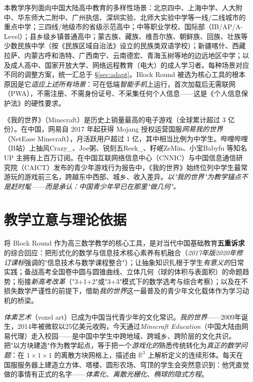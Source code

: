 \documentclass[12pt,a4paper]{scrartcl}
\newcommand{\acc}[1]{\textcolor{accent}{\textbf{#1}}}
\begin{document}
\begin{zhushi}[中国大陆高中的多样性]
本教学序列面向中国大陆高中教育的多样性场景：北京四中、上海中学、人大附中、华东师大二附中、广州执信、深圳实验、北师大实验中学等一线/二线城市的重点中学；三四线/地级市的省级示范高中；中等职业学校、国际部（IB/AP/A-Level）；县乡级乡镇普通高中；蒙古族、藏族、维吾尔族、朝鲜族、回族、壮族等少数民族中学（按《民族区域自治法》设立的民族类双语学校）；新疆喀什、西藏拉萨、内蒙古呼和浩特、广西南宁、云南德宏、青海玉树等地的边远地区中学；以及成人高中、国家开放大学、网络远程教育（电大）的成人学习者。每种场景对应不同的调整方案，统一汇总于 §\ref{sec:adapt}。Block Round 被选为核心工具的根本原因是它\emph{适应上述所有场景}：可在低端\emph{智能手机}上运行，首次加载后无需联网（PWA），不需注册、不需身份证号、不采集任何个人信息——这是《个人信息保护法》的硬性要求。
\end{zhushi}

\begin{minecraft}
《我的世界》（Minecraft）是历史上销量最高的电子游戏（全球累计超过 3 亿份）。在中国，网易自 2017 年起获得 Mojang 授权运营国服\emph{网易我的世界}（NetEase Minecraft），月活跃用户超过 1 亿，其中相当比例为中学生。哔哩哔哩（B站）上抽风Crazy\_、Joe粥、锐刻五Reek\_、籽岷ZeMin、小宝Babyfu 等知名 UP 主拥有上百万订阅。在中国互联网络信息中心（CNNIC）与中国信息通信研究院（CAICT）发布的青少年游戏行为报告中，《我的世界》始终位列中学生最常游玩的游戏前三名，跨越东中西部、城乡、收入差异。\emph{以"我的世界"为教学锚点不是赶时髦——而是承认：中国青少年早已在那里"做几何"。}
\end{minecraft}

\section{教学立意与理论依据}\label{sec:justificativa}

将 Block Round 作为高三数学教学的核心工具，是对当代中国基础教育\acc{五重诉求}的综合回应：把形式化的数学与信息技术核心素养有机融合（\emph{2017年版2020年修订课标}强调的"信息技术与数学课程整合"）；让抽象知识扎根于学生\emph{有意义的}日常实践；备战高考全国卷中圆与圆锥曲线、立体几何（球的体积与表面积）的命题趋势；衔接\emph{新高考改革}（"3+1+2"或"3+3"模式下的数学选考与综合考察）；以及在不损失数学严谨性的前提下，借助\emph{我的世界}这一最普及的青少年文化载体作为学习动机的桥梁。

\emph{体素艺术}（voxel art）已成为中国当代青少年的文化常识。\emph{我的世界}——2009年诞生，2014年被微软以25亿美元收购，今天通过\emph{Minecraft Education}（中国大陆由网易代理）走入校园——是中国中学生中跨地域、跨城乡、跨阶层的文化共识。把"以方块建造"作为教学起点，等于把一个\emph{游戏化的}熟悉传统转化为\emph{真正的数学问题}：在 $1 \times 1 \times 1$ 的离散方块网格上，描述由 $\mathbb{R}^3$ 上解析定义的连续形体。每天在国服服务器上建造立方体、塔楼、圆形农场、穹顶的学生会突然意识到：他凭直觉做的事情有正式的名字——\emph{体素化}、\emph{离散光栅化}、\emph{椭球的隐式方程}。
\end{document}
